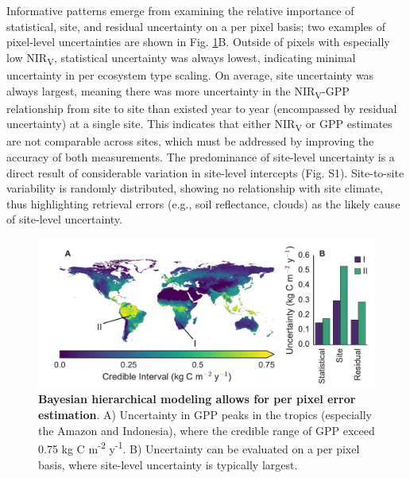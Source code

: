 \documentclass[10pt,letterpaper]{article}
\begin{document}
Informative patterns emerge from examining the relative importance of statistical, site, and residual uncertainty on a per pixel basis; two examples of pixel-level uncertainties are shown in Fig. \ref{fig:uncertainty_map}B. Outside of pixels with especially low NIR\textsubscript{V}, statistical uncertainty was always lowest, indicating minimal uncertainty in per ecosystem type scaling.  On average, site uncertainty was always largest, meaning there was more uncertainty in the NIR\textsubscript{V}-GPP relationship from site to site than existed year to year (encompassed by residual uncertainty) at a single site. This indicates that either NIR\textsubscript{V} or GPP estimates are not comparable across sites, which must be addressed by improving the accuracy of both measurements. The predominance of site-level uncertainty is a direct result of considerable variation in site-level intercepts (Fig. S1). Site-to-site variability is randomly distributed, showing no relationship with site climate, thus highlighting retrieval errors (e.g., soil reflectance, clouds) as the likely cause of site-level uncertainty.

\begin{figure}
    \centering
    \includegraphics[width=\textwidth, keepaspectratio]{figure_uncertainty_area.pdf}
    \caption{\textbf{Bayesian hierarchical modeling allows for per pixel error estimation}. A) Uncertainty in GPP peaks in the tropics (especially the Amazon and Indonesia), where the credible range of GPP exceed 0.75 kg C m\textsuperscript{-2} y\textsuperscript{-1}. B) Uncertainty can be evaluated on a per pixel basis, where  site-level uncertainty is typically largest.}
    \label{fig:uncertainty_map}
\end{figure}
\end{document}
